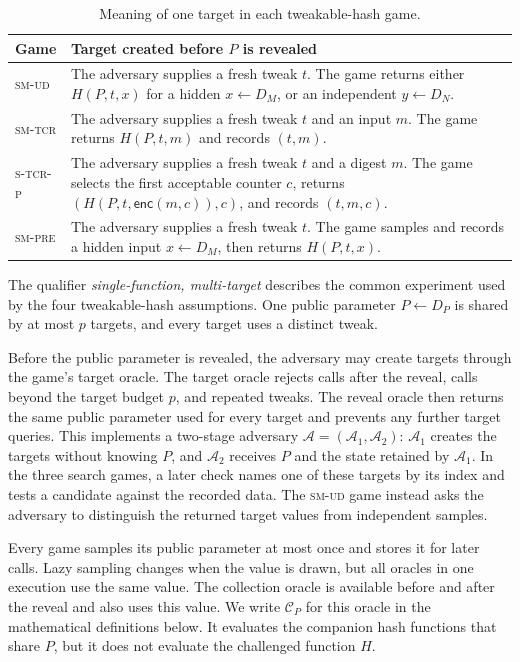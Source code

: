 \documentclass[11pt,a4paper]{article}
\theoremstyle{plain}
\theoremstyle{definition}
\newcommand{\A}{\mathcal{A}}
\newcommand{\smud}{\textsc{sm-ud}\xspace}
\newcommand{\smtcr}{\textsc{sm-tcr}\xspace}
\newcommand{\smpre}{\textsc{sm-pre}\xspace}
\newcommand{\stcrp}{\textsc{s-tcr-p}\xspace}
\begin{document}
\begin{table}[H]
\centering
\caption{Meaning of one target in each tweakable-hash game.}
\label{tab:targets}
\small
\begin{tabular}{@{}L{0.16\textwidth}L{0.76\textwidth}@{}}
\toprule
Game & Target created before \(P\) is revealed \\
\midrule
\smud & The adversary supplies a fresh tweak \(t\). The game returns either \(H(P,t,x)\) for a hidden \(x\leftarrow D_M\), or an independent \(y\leftarrow D_N\). \\
\smtcr & The adversary supplies a fresh tweak \(t\) and an input \(m\). The game returns \(H(P,t,m)\) and records \((t,m)\). \\
\stcrp & The adversary supplies a fresh tweak \(t\) and a digest \(m\). The game selects the first acceptable counter \(c\), returns \((H(P,t,\mathsf{enc}(m,c)),c)\), and records \((t,m,c)\). \\
\smpre & The adversary supplies a fresh tweak \(t\). The game samples and records a hidden input \(x\leftarrow D_M\), then returns \(H(P,t,x)\). \\
\bottomrule
\end{tabular}
\end{table}

The qualifier \emph{single-function, multi-target} describes the common experiment used by the four tweakable-hash assumptions.
One public parameter \(P\leftarrow D_P\) is shared by at most \(p\) targets, and every target uses a distinct tweak.

Before the public parameter is revealed, the adversary may create targets through the game's target oracle.
The target oracle rejects calls after the reveal, calls beyond the target budget \(p\), and repeated tweaks.
The reveal oracle then returns the same public parameter used for every target and prevents any further target queries.
This implements a two-stage adversary \(\A=(\A_1,\A_2)\): \(\A_1\) creates the targets without knowing \(P\), and \(\A_2\) receives \(P\) and the state retained by \(\A_1\).
In the three search games, a later check names one of these targets by its index and tests a candidate against the recorded data.
The \smud game instead asks the adversary to distinguish the returned target values from independent samples.

Every game samples its public parameter at most once and stores it for later calls.
Lazy sampling changes when the value is drawn, but all oracles in one execution use the same value.
The collection oracle is available before and after the reveal and also uses this value.
We write \(\mathcal C_P\) for this oracle in the mathematical definitions below.
It evaluates the companion hash functions that share \(P\), but it does not evaluate the challenged function \(H\).
\end{document}
